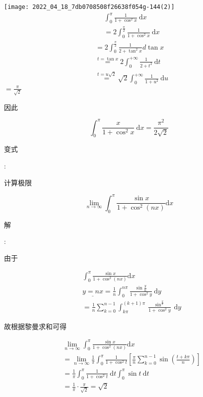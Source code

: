 \documentclass[10pt]{article}
\begin{document}
\texttt{[image: 2022\_04\_18\_7db0708508f26638f054g-144(2)]}
$$
\begin{aligned}
&\int_{0}^{\pi} \frac{1}{1+\cos ^{2} x} \mathrm{~d} x \\
&=2 \int_{0}^{\frac{\pi}{2}} \frac{1}{1+\cos ^{2} x} \mathrm{~d} x
\end{aligned}
$$
$$
\begin{aligned}
& =2 \int_{0}^{\frac{\pi}{2}} \frac{1}{2+\tan ^{2} x} d \tan x \\
& \stackrel{t=\tan x}{=} 2 \int_{0}^{+\infty} \frac{1}{2+t^{2}} \mathrm{~d} t \\
& \stackrel{t=u \sqrt{2}}{=} \sqrt{2} \int_{0}^{+\infty} \frac{1}{1+u^{2}} \mathrm{~d} u
\end{aligned}
$$
$=\frac{\pi}{\sqrt{2}}$ \begin{CJK}{UTF8}{mj}因此\end{CJK}
$$
\int_{0}^{\pi} \frac{x}{1+\cos ^{2} x} \mathrm{~d} x=\frac{\pi^{2}}{2 \sqrt{2}}
$$
\begin{CJK}{UTF8}{mj}变式\end{CJK}: \begin{CJK}{UTF8}{mj}计算极限\end{CJK}
$$
\lim _{n \rightarrow \infty} \int_{0}^{\pi} \frac{\sin x}{1+\cos ^{2}(n x)} \mathrm{d} x
$$
\begin{CJK}{UTF8}{mj}解\end{CJK}: \begin{CJK}{UTF8}{mj}由于\end{CJK}
$$
\begin{aligned}
&\int_{0}^{\pi} \frac{\sin x}{1+\cos ^{2}(n x)} \mathrm{d} x \\
&\underline{y=n x}=\frac{1}{n} \int_{0}^{n \pi} \frac{\sin \frac{y}{n}}{1+\cos ^{2} y} \mathrm{~d} y \\
&=\frac{1}{n} \sum_{k=0}^{n-1} \int_{k \pi}^{(k+1) \pi} \frac{\sin ^{\frac{y}{n}}}{1+\cos ^{2} y} \mathrm{~d} y
\end{aligned}
$$
\begin{CJK}{UTF8}{mj}故根据黎曼求和可得\end{CJK}
$$
\begin{aligned}
&\lim _{n \rightarrow \infty} \int_{0}^{\pi} \frac{\sin x}{1+\cos ^{2}(n x)} \mathrm{d} x \\
&=\lim _{n \rightarrow \infty} \frac{1}{\pi} \int_{0}^{\pi} \frac{1}{1+\cos ^{2} t}\left[\frac{\pi}{n} \sum_{k=0}^{n-1} \sin \left(\frac{t+k \pi}{n}\right)\right] \\
&=\frac{1}{\pi} \int_{0}^{\pi} \frac{1}{1+\cos ^{2} t} \mathrm{~d} t \int_{0}^{\pi} \sin t \mathrm{~d} t \\
&=\frac{1}{\pi} \cdot \frac{\pi}{\sqrt{2}}=\sqrt{2}
\end{aligned}
$$
\end{document}
